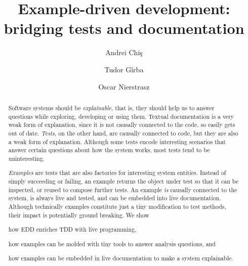 \documentclass[sigplan,anonymous,review,10pt]{acmart}
\begin{document}
\title{Example-driven development: \\ bridging tests and documentation}
\author{Andrei Chi\c{s}}
\author{Tudor G\^irba}
\author{Oscar Nierstrasz}

\renewcommand{\shortauthors}{Chi\c{s} et al.}

\begin{abstract}
Software systems should be \emph{explainable}, that is, they should help us to answer questions while exploring, developing or using them.
Textual documentation is a very weak form of explanation, since it is not causally connected to the code, so easily gets out of date.
\emph{Tests}, on the other hand, are causally connected to code, but they are also a weak form of explanation.
Although some tests encode interesting scenarios that answer certain questions about how the system works, most tests tend to be uninteresting.

\emph{Examples} are tests that are also factories for interesting system entities.
Instead of simply succeeding or failing, an example returns the object under test so that it can be inspected, or reused to compose further tests.
An example \emph{is} causally connected to the system, is always live and tested, and can be embedded into live documentation.
Although technically examples constitute just a tiny modification to test methods, their impact is potentially ground breaking.
We show
\begin{inparaenum}[(i)]
	\item how EDD enriches TDD with live programming,
	\item how examples can be molded with tiny tools to answer analysis questions, and	\item how examples can be embedded in live documentation to make a system explainable.
\end{inparaenum}
\end{abstract}


\end{document}
